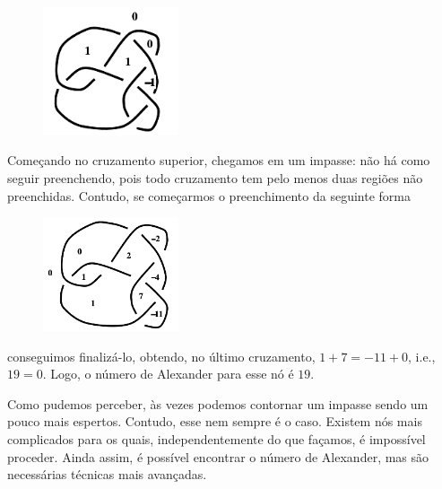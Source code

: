 	\begin{figure}[H]
		\begin{center}
			\includegraphics[width=4cm]{Images/no_preenchimento_incompleto.png}
		\end{center}
	\end{figure}
	\par\vspace{0.3cm} Começando no cruzamento superior, chegamos em um impasse: não há como seguir preenchendo, pois todo cruzamento tem pelo menos duas regiões não preenchidas. Contudo, se começarmos o preenchimento da seguinte forma
	\begin{figure}[H]
		\begin{center}
			\includegraphics[width=4cm]{Images/no_preenchimento_completo.png}
		\end{center}
	\end{figure}
	\par\vspace{0.3cm} conseguimos finalizá-lo, obtendo, no último cruzamento, $1+7=-11+0$, i.e., $19=0$. Logo, o número de Alexander para esse nó é $19$.
	\par\vspace{0.3cm} Como pudemos perceber, às vezes podemos contornar um impasse sendo um pouco mais espertos. Contudo, esse nem sempre é o caso. Existem nós mais complicados para os quais, independentemente do que façamos, é impossível proceder. Ainda assim, é possível encontrar o número de Alexander, mas são necessárias técnicas mais avançadas.